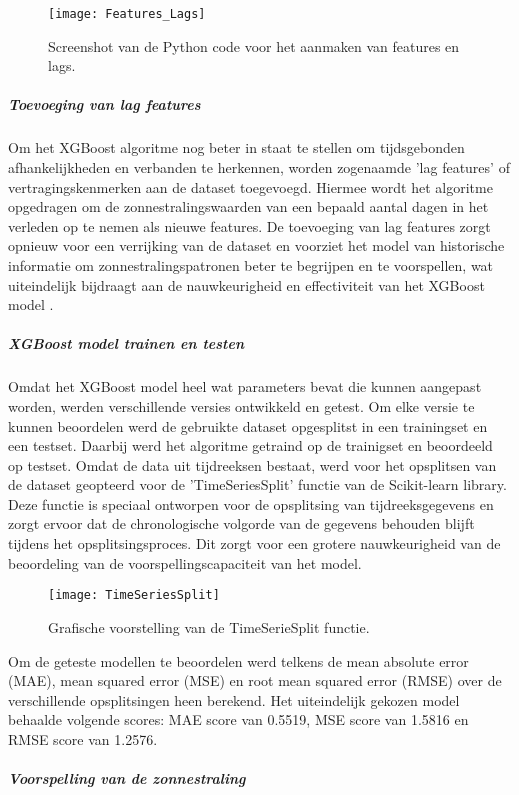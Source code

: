 \begin{figure}[h!]
    \centering\texttt{[image: Features\_Lags]}
    \caption{\label{fig:Features_Lags}Screenshot van de Python code voor het aanmaken van features en lags.}
\end{figure} 

\subparagraph{Toevoeging van lag features}
Om het XGBoost algoritme nog beter in staat te stellen om tijdsgebonden afhankelijkheden en verbanden te herkennen, worden zogenaamde 'lag features' of vertragingskenmerken aan de dataset toegevoegd. Hiermee wordt het algoritme opgedragen om de zonnestralingswaarden van een bepaald aantal dagen in het verleden op te nemen als nieuwe features. De toevoeging van lag features zorgt opnieuw voor een verrijking van de dataset en voorziet het model van historische informatie om zonnestralingspatronen beter te begrijpen en te voorspellen, wat uiteindelijk bijdraagt aan de nauwkeurigheid en effectiviteit van het XGBoost model \autocite{Nabatchian2024}.

\subparagraph{XGBoost model trainen en testen}
Omdat het XGBoost model heel wat parameters bevat die kunnen aangepast worden, werden verschillende versies ontwikkeld en getest. Om elke versie te kunnen beoordelen werd de gebruikte dataset opgesplitst in een trainingset en een testset. Daarbij werd het algoritme getraind op de trainigset en beoordeeld op testset. Omdat de data uit tijdreeksen bestaat, werd voor het opsplitsen van de dataset geopteerd voor de 'TimeSeriesSplit' functie van de Scikit-learn library. Deze functie is speciaal ontworpen voor de opsplitsing van tijdreeksgegevens en zorgt ervoor dat de chronologische volgorde van de gegevens behouden blijft tijdens het opsplitsingsproces. Dit zorgt voor een grotere nauwkeurigheid van de beoordeling van de voorspellingscapaciteit van het model.

\begin{figure}[h!]
    \centering\texttt{[image: TimeSeriesSplit]}
    \caption{\label{fig:TimeSeriesSplit}Grafische voorstelling van de TimeSerieSplit functie.}
\end{figure} 

Om de geteste modellen te beoordelen werd telkens de mean absolute error (MAE), mean squared error (MSE) en root mean squared error (RMSE) over de verschillende opsplitsingen heen berekend. Het uiteindelijk gekozen model behaalde volgende scores: MAE score van 0.5519, MSE score van 1.5816 en RMSE score van 1.2576.

\subparagraph{Voorspelling van de zonnestraling}

